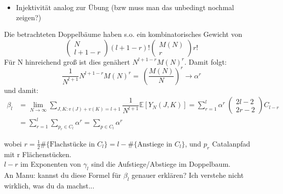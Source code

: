 \documentclass[a4paper, 11pt]{scrreprt}
\newenvironment{beweis}[1][Beweis]{\begin{trivlist}
	\item[\hskip \labelsep {\bfseries #1}]}
	{\end{trivlist}}
\newcommand{\EE}{\mathbb{E}}
\begin{document}
\begin{beweis}
\begin{itemize}
\item[•] Injektivität analog zur Übung (bzw muss man das unbedingt nochmal zeigen?)\\
\end{itemize}
Die betrachteten Doppelbäume haben s.o. ein kombinatorisches Gewicht von 
	\[ \begin{pmatrix} N\\ l+1-r\end{pmatrix} (l+1-r)! \begin{pmatrix} M(N)\\r\end{pmatrix} r! \]
Für N hinreichend groß ist dies genähert \(N^{l+1-r}M(N)^r\). Damit folgt:
	\[\frac {1}{N^{l+1}} N^{l+1-r}M(N)^r =~ \left( \dfrac{M(N)}{N}\right)^{r}\to \alpha^r\]
und damit:
	\begin{align*}
		\beta_l &= \lim_{N \to \infty} \sum_{J,K: v(J)+v(K) = l+1} \dfrac{1}{N^{l+1}}\EE[Y_N(J,K)] = \sum_{r=1}^{l} \alpha^r\ \begin{pmatrix} 2l-2\\2r-2\end{pmatrix} C_{l-r} \\
		&= \sum_{r=1}^{l} \sum_{p_{r} \in C_{l}} \alpha^{r} = \sum_{p\in C_l} \alpha^r
	\end{align*}

wobei \(r = \frac 1 2 \#\{\text{Flachstücke in }C_l\} = l  - \#\{\text{Anstiege in }  C_l\}\), und $ p_{r} $ Catalanpfad mit r Flächenstücken.\\
$ l-r $ im Exponenten von $ \gamma_{l} $ sind die Aufstiege/Abstiege im Doppelbaum.\\


An Manu: kannst du diese Formel für \(\beta_l\) genauer erklären? Ich verstehe nicht wirklich, was du da machst...\\



\end{beweis}
\end{document}

